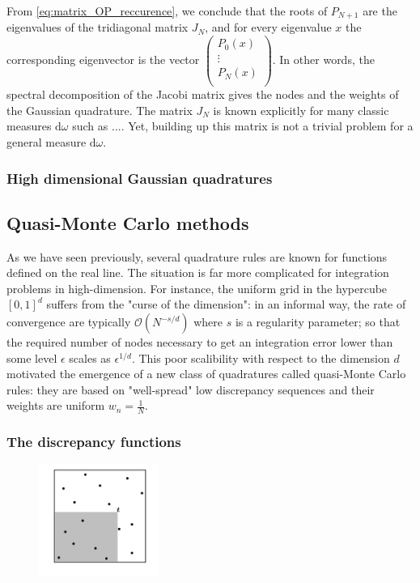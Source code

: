 \documentclass[twoside,11pt]{book}
\begin{document}
From \eqref{eq:matrix_OP_reccurence}, we conclude that the roots of $P_{N+1}$ are the eigenvalues of the tridiagonal matrix $J_{N}$, and for every eigenvalue $x$ the corresponding eigenvector is the vector $\begin{pmatrix}
P_{0}(x)  \\
\vdots \\
P_{N}(x) \\
\end{pmatrix}$. In other words, the spectral decomposition of the Jacobi matrix gives the nodes and the weights of the Gaussian quadrature. The matrix $J_{N}$ is known explicitly for many classic measures $\mathrm{d}\omega$ such as .... Yet, building up this matrix is not a trivial problem for a general measure $\mathrm{d}\omega$.


\subsubsection{High dimensional Gaussian quadratures}


\subsection{Quasi-Monte Carlo methods}

As we have seen previously, several quadrature rules are known for functions defined on the real line. The situation is far more complicated for integration problems in high-dimension. For instance, the uniform grid in the hypercube $[0,1]^{d}$ suffers from the "curse of the dimension": in an informal way, the rate of convergence are typically $\mathcal{O}(N^{-s/d})$ where $s$ is a regularity parameter; so that the required number of nodes necessary to get an integration error lower than some level $\epsilon$ scales as $\epsilon^{1/d}$. This poor scalibility with respect to the dimension $d$ motivated the emergence of a new class of quadratures called quasi-Monte Carlo rules: they are based on "well-spread" low discrepancy sequences and their weights are uniform $\displaystyle w_{n} = \frac{1}{N}$.



 
\subsubsection{The discrepancy functions}

\begin{figure}
\centering
\includegraphics[width= 0.35\textwidth]{img/discrepancy/local_disc.png}
\caption{\label{fig:local_discrepancy}}
\end{figure}
\end{document}
